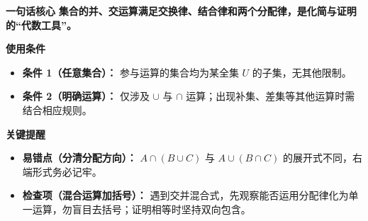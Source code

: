 \begin{summarybox}
	\textbf{\textcolor{CSummary}{一句话核心}}
	\textbf{集合的并、交运算满足交换律、结合律和两个分配律，是化简与证明的“代数工具”。}

	\medskip
	\textbf{\textcolor{CSummary}{使用条件}}
	\begin{itemize}[leftmargin=*, itemsep=0.5em, topsep=0.4em]
		\item \textbf{条件 1（任意集合）：} 参与运算的集合均为某全集 $U$ 的子集，无其他限制。
		\item \textbf{条件 2（明确运算）：} 仅涉及 $\cup$ 与 $\cap$ 运算；出现补集、差集等其他运算时需结合相应规则。
	\end{itemize}

	\medskip
	\textbf{\textcolor{CSummary}{关键提醒}}
	\begin{itemize}[leftmargin=*, itemsep=0.5em, topsep=0.4em]
		\item \textbf{易错点（分清分配方向）：} $A\cap(B\cup C)$ 与 $A\cup(B\cap C)$ 的展开式不同，右端形式务必记牢。
		\item \textbf{检查项（混合运算加括号）：} 遇到交并混合式，先观察能否运用分配律化为单一运算，勿盲目去括号；证明相等时坚持双向包含。
	\end{itemize}

\end{summarybox}
